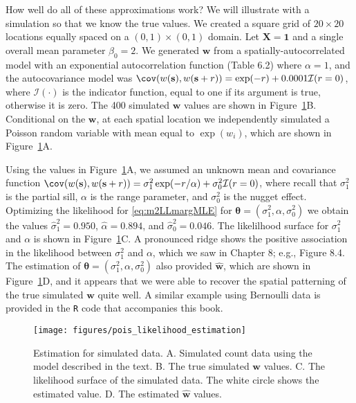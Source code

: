 \documentclass[12pt, titlepage]{article}
\begin{document}
How well do all of these approximations work?  We will illustrate with a simulation so that we know the true values.  We created a square grid of $20 \times 20$ locations equally spaced on a $(0,1) \times (0,1)$ domain. Let $\mathbf{X} = \mathbf{1}$ and a single overall mean parameter $\beta_{0} = 2$.  We generated $\mathbf{w}$ from a spatially-autocorrelated model with an exponential autocorrelation function (Table 6.2) where $\alpha = 1$, and the autocovariance model was $\cov(w(\mathbf{s}),w(\mathbf{s} + r)) = \exp(-r) + 0.0001\mathcal{I}(r = 0)$, where $\mathcal{I}(\cdot)$ is the indicator function, equal to one if its argument is true, otherwise it is zero.  The 400 simulated $\mathbf{w}$ values are shown in Figure~\ref{Fig:sglm_likelihood_estimation}B.  Conditional on the $\mathbf{w}$, at each spatial location we independently simulated a Poisson random variable with mean equal to $\exp(w_{i})$, which are shown in Figure~\ref{Fig:sglm_likelihood_estimation}A.

Using the values in Figure~\ref{Fig:sglm_likelihood_estimation}A, we assumed an unknown mean and covariance function $\cov(w(\mathbf{s}),w(\mathbf{s} + r)) = \sigma_{1}^{2}\exp(-r/\alpha) + \sigma^{2}_{0}\mathcal{I}(r = 0)$, where recall that $\sigma_{1}^{2}$ is the partial sill, $\alpha$ is the range parameter, and $\sigma_{0}^{2}$ is the nugget effect.  Optimizing the likelihood for \eqref{eq:m2LLmargMLE} for $\boldsymbol{\theta} = (\sigma_{1}^{2},\alpha, \sigma_{0}^{2})$ we obtain the values $\hat{\sigma}_{1}^{2} = 0.950$, $\hat{\alpha} = 0.894$, and $\hat{\sigma}_{0}^{2} = 0.046$.  The likelilhood surface for $\sigma_{1}^{2}$ and $\alpha$ is shown in Figure~\ref{Fig:sglm_likelihood_estimation}C. A pronounced ridge shows the positive association in the likelihood between $\sigma_{1}^{2}$ and $\alpha$, which we saw in Chapter 8; e.g., Figure 8.4. The estimation of $\boldsymbol{\theta} = (\sigma_{1}^{2},\alpha, \sigma_{0}^{2})$ also provided $\hat{\mathbf{w}}$, which are shown in Figure~\ref{Fig:sglm_likelihood_estimation}D, and it appears that we were able to recover the spatial patterning of the true simulated $\mathbf{w}$ quite well.  A similar example using Bernoulli data is provided in the \texttt{R} code that accompanies this book.

\begin{figure}[H]
  \begin{center}
	    \texttt{[image: figures/pois\_likelihood\_estimation]}
  \end{center}
  \caption{Estimation for simulated data. A. Simulated count data using the model described in the text.  B. The true simulated $\mathbf{w}$ values. C. The likelihood surface of the simulated data.  The white circle shows the estimated value.  D. The estimated $\hat{\mathbf{w}}$ values. \label{Fig:sglm_likelihood_estimation}}
\end{figure}
\end{document}
